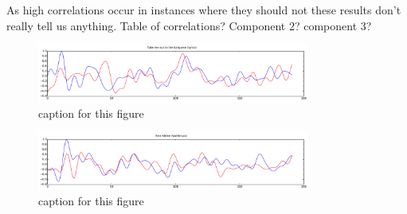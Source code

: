 As high correlations occur in instances where they should not these results don't really tell us anything.
Table of correlations? Component 2? component 3? 

\begin{figure}[t]
  \begin{center}
    \includegraphics[width=0.8\textwidth,keepaspectratio=true]{Figures/component_timecourse_ballgame.pdf}
    \caption{
caption for this figure
}
    \label{fig:ballgame}
  \end{center}
\end{figure}

\begin{figure}[t]
  \begin{center}
    \includegraphics[width=0.8\textwidth,keepaspectratio=true]{Figures/component_timecourse_nachtmusic.pdf}
    \caption{
caption for this figure
}
    \label{fig:nachtmusic}
  \end{center}
\end{figure}